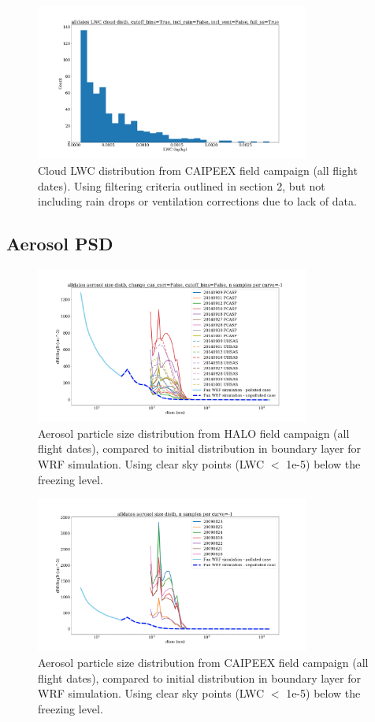 \documentclass{article}
\begin{document}
\begin{figure}[ht]
    \centering
    \includegraphics[width=9cm]{revcaipeex/v10_lwc_hist_alldates_figure.png}
    \caption{Cloud LWC distribution from CAIPEEX field campaign (all flight dates). Using filtering criteria outlined in section 2, but not including rain drops or ventilation corrections due to lack of data.}
    \label{caipeexlwchist}
\end{figure}

\subsection{Aerosol PSD}
\begin{figure}[ht]
    \centering
    \includegraphics[width=9cm]{revhalo/v1_aero_size_distb_alldates_figure.png}
    \caption{Aerosol particle size distribution from HALO field campaign (all flight dates), compared to initial distribution in boundary layer for WRF simulation. Using clear sky points (LWC $\lt$ 1e-5) below the freezing level.}
    \label{haloasdhist}
\end{figure}
\begin{figure}[ht]
    \centering
    \includegraphics[width=9cm]{revcaipeex/v1_aero_size_distb_alldates_figure.png}
    \caption{Aerosol particle size distribution from CAIPEEX field campaign (all flight dates), compared to initial distribution in boundary layer for WRF simulation. Using clear sky points (LWC $\lt$ 1e-5) below the freezing level.}
    \label{caipeexasdhist}
\end{figure}
\end{document}
